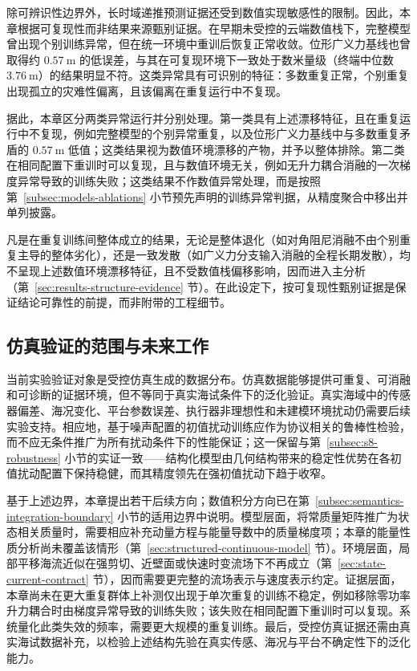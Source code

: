 \documentclass[UTF8,zihao=-4]{ctexrep}
\begin{document}
除可辨识性边界外，长时域递推预测证据还受到数值实现敏感性的限制。因此，本章根据可复现性而非结果来源甄别证据。在早期未受控的云端数值栈下，完整模型曾出现个别训练异常，但在统一环境中重训后恢复正常收敛。位形广义力基线也曾取得约 \(0.57~\mathrm{m}\) 的低误差，与其在可复现环境下一致处于数米量级（终端中位数 \(3.76~\mathrm{m}\)）的结果明显不符。这类异常具有可识别的特征：多数重复正常，个别重复出现孤立的灾难性偏离，且该偏离在重复运行中不复现。

据此，本章区分两类异常运行并分别处理。第一类具有上述漂移特征，且在重复运行中不复现，例如完整模型的个别异常重复，以及位形广义力基线中与多数重复矛盾的 \(0.57~\mathrm{m}\) 低值；这类结果视为数值环境漂移的产物，并予以整体排除。第二类在相同配置下重训时可以复现，且与数值环境无关，例如无升力耦合消融的一次梯度异常导致的训练失败；这类结果不作数值异常处理，而是按照第~\ref{subsec:models-ablations} 小节预先声明的训练异常判据，从精度聚合中移出并单列披露。

凡是在重复训练间整体成立的结果，无论是整体退化（如对角阻尼消融不由个别重复主导的整体劣化），还是一致发散（如广义力分支输入消融的全程长期发散），均不呈现上述数值环境漂移特征，且不受数值栈偏移影响，因而进入主分析（第~\ref{sec:results-structure-evidence} 节）。在此设定下，按可复现性甄别证据是保证结论可靠性的前提，而非附带的工程细节。

\subsection{仿真验证的范围与未来工作}

当前实验验证对象是受控仿真生成的数据分布。仿真数据能够提供可重复、可消融和可诊断的证据环境，但不等同于真实海试条件下的泛化验证。真实海域中的传感器偏差、海况变化、平台参数误差、执行器非理想性和未建模环境扰动仍需要后续实验支持。相应地，基于噪声配置的初值扰动训练应作为协议相关的鲁棒性检验，而不应无条件推广为所有扰动条件下的性能保证；这一保留与第~\ref{subsec:s8-robustness} 小节的实证一致——结构化模型由几何结构带来的稳定性优势在各初值扰动配置下保持稳健，而其精度领先在强初值扰动下趋于收窄。

基于上述边界，本章提出若干后续方向；数值积分方向已在第~\ref{subsec:semantics-integration-boundary} 小节的适用边界中说明。模型层面，将常质量矩阵推广为状态相关质量时，需要相应补充动量方程与能量导数中的质量梯度项；本章的能量性质分析尚未覆盖该情形（第~\ref{sec:structured-continuous-model} 节）。环境层面，局部平移海流近似在强剪切、近壁面或快速时变流场下不再成立（第~\ref{sec:state-current-contract} 节），因而需要更完整的流场表示与速度表示约定。证据层面，本章尚未在更大重复群体上补测仅出现于单次重复的训练不稳定，例如移除零功率升力耦合时由梯度异常导致的训练失败；该失败在相同配置下重训时可以复现。系统量化此类失效的频率，需要更大规模的重复训练。最后，受控仿真证据还需由真实海试数据补充，以检验上述结构先验在真实传感、海况与平台不确定性下的泛化能力。
\end{document}
